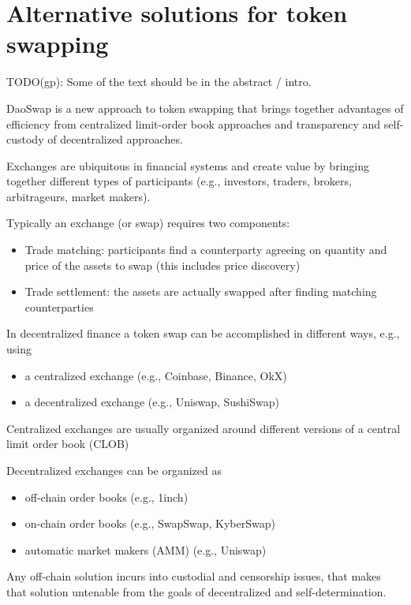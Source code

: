 \documentclass[11pt, reqno]{amsart}
\begin{document}
\section{Alternative solutions for token swapping}

TODO(gp): Some of the text should be in the abstract / intro.

DaoSwap is a new approach to token swapping that brings together advantages of
efficiency from centralized limit-order book approaches and transparency and
self-custody of decentralized approaches.

Exchanges are ubiquitous in financial systems and create value by bringing
together different types of participants (e.g., investors, traders, brokers,
arbitrageurs, market makers).

Typically an exchange (or swap) requires two components:
\begin{itemize}
	\item Trade matching: participants find a counterparty agreeing on quantity and
	      price of the assets to swap (this includes price discovery)
	\item Trade settlement: the assets are actually swapped after finding
	      matching counterparties
\end{itemize}

In decentralized finance a token swap can be accomplished in different ways, e.g., using
\begin{itemize}
	\item a centralized exchange (e.g., Coinbase, Binance, OkX)
	\item a decentralized exchange (e.g., Uniswap, SushiSwap)
\end{itemize}

Centralized exchanges are usually organized around different versions of a
central limit order book (CLOB)

Decentralized exchanges can be organized as
\begin{itemize}
	\item off-chain order books (e.g., 1inch)
	\item on-chain order books (e.g., SwapSwap, KyberSwap)
	\item automatic market makers (AMM) (e.g., Uniswap)
\end{itemize}

Any off-chain solution incurs into custodial and censorship issues, that makes
that solution untenable from the goals of decentralized and self-determination.
\end{document}
